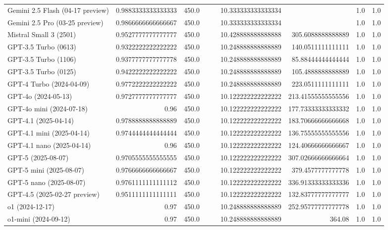 \begin{table}[htp]
{\begin{tabular}{lrrrrrrrr}
Gemini 2.5 Flash (04-17 preview) & 0.9883333333333333 & 450.0 &  &  & 10.333333333333334 &  & 1.0 & 1.0 \\
Gemini 2.5 Pro (03-25 preview) & 0.9866666666666667 & 450.0 &  &  & 10.333333333333334 &  & 1.0 & 1.0 \\
Mistral Small 3 (2501) & 0.9527777777777777 & 450.0 &  &  & 10.428888888888888 & 305.6088888888889 & 1.0 & 1.0 \\
GPT-3.5 Turbo (0613) & 0.9322222222222222 & 450.0 &  &  & 10.248888888888889 & 140.0511111111111 & 1.0 & 1.0 \\
GPT-3.5 Turbo (1106) & 0.9377777777777778 & 450.0 &  &  & 10.248888888888889 & 85.88444444444444 & 1.0 & 1.0 \\
GPT-3.5 Turbo (0125) & 0.9422222222222222 & 450.0 &  &  & 10.248888888888889 & 105.4888888888889 & 1.0 & 1.0 \\
GPT-4 Turbo (2024-04-09) & 0.9772222222222222 & 450.0 &  &  & 10.248888888888889 & 223.0511111111111 & 1.0 & 1.0 \\
GPT-4o (2024-05-13) & 0.9727777777777777 & 450.0 &  &  & 10.122222222222222 & 213.41555555555556 & 1.0 & 1.0 \\
GPT-4o mini (2024-07-18) & 0.96 & 450.0 &  &  & 10.122222222222222 & 177.73333333333332 & 1.0 & 1.0 \\
GPT-4.1 (2025-04-14) & 0.9788888888888889 & 450.0 &  &  & 10.122222222222222 & 183.70666666666668 & 1.0 & 1.0 \\
GPT-4.1 mini (2025-04-14) & 0.9744444444444444 & 450.0 &  &  & 10.122222222222222 & 136.75555555555556 & 1.0 & 1.0 \\
GPT-4.1 nano (2025-04-14) & 0.96 & 450.0 &  &  & 10.122222222222222 & 124.40666666666667 & 1.0 & 1.0 \\
GPT-5 (2025-08-07) & 0.9705555555555555 & 450.0 &  &  & 10.122222222222222 & 307.02666666666664 & 1.0 & 1.0 \\
GPT-5 mini (2025-08-07) & 0.9766666666666667 & 450.0 &  &  & 10.122222222222222 & 379.4577777777778 & 1.0 & 1.0 \\
GPT-5 nano (2025-08-07) & 0.9761111111111112 & 450.0 &  &  & 10.122222222222222 & 336.91333333333336 & 1.0 & 1.0 \\
GPT-4.5 (2025-02-27 preview) & 0.9511111111111111 & 450.0 &  &  & 10.122222222222222 & 132.83777777777777 & 1.0 & 1.0 \\
o1 (2024-12-17) & 0.97 & 450.0 &  &  & 10.248888888888889 & 252.95777777777778 & 1.0 & 1.0 \\
o1-mini (2024-09-12) & 0.97 & 450.0 &  &  & 10.248888888888889 & 364.08 & 1.0 & 1.0 \\

\end{tabular}}
\end{table}
